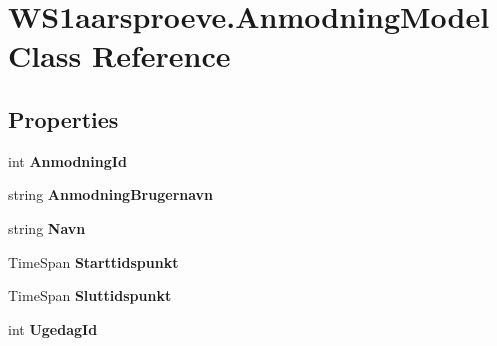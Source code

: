 \hypertarget{class_w_s1aarsproeve_1_1_anmodning_model}{}\section{W\+S1aarsproeve.\+Anmodning\+Model Class Reference}
\label{class_w_s1aarsproeve_1_1_anmodning_model}
\subsection*{Properties}
\begin{DoxyCompactItemize}
\item 
\hypertarget{class_w_s1aarsproeve_1_1_anmodning_model_a888fb493a1f91da3fce495f4191aa8a1}{}int {\bfseries Anmodning\+Id}\label{class_w_s1aarsproeve_1_1_anmodning_model_a888fb493a1f91da3fce495f4191aa8a1}

\item 
\hypertarget{class_w_s1aarsproeve_1_1_anmodning_model_aa9f6adc7f666e3f3eff29c62a34b49e9}{}string {\bfseries Anmodning\+Brugernavn}\label{class_w_s1aarsproeve_1_1_anmodning_model_aa9f6adc7f666e3f3eff29c62a34b49e9}

\item 
\hypertarget{class_w_s1aarsproeve_1_1_anmodning_model_a2193d20eb20b854efda017a500c1c600}{}string {\bfseries Navn}\label{class_w_s1aarsproeve_1_1_anmodning_model_a2193d20eb20b854efda017a500c1c600}

\item 
\hypertarget{class_w_s1aarsproeve_1_1_anmodning_model_a1428099a99c971a65493972cd4142b6f}{}Time\+Span {\bfseries Starttidspunkt}\label{class_w_s1aarsproeve_1_1_anmodning_model_a1428099a99c971a65493972cd4142b6f}

\item 
\hypertarget{class_w_s1aarsproeve_1_1_anmodning_model_a4b9c1312a7626fde76a4b2b6bea6b8bd}{}Time\+Span {\bfseries Sluttidspunkt}\label{class_w_s1aarsproeve_1_1_anmodning_model_a4b9c1312a7626fde76a4b2b6bea6b8bd}

\item 
\hypertarget{class_w_s1aarsproeve_1_1_anmodning_model_a0f7af291718b9b214377949445ac6a3d}{}int {\bfseries Ugedag\+Id}\label{class_w_s1aarsproeve_1_1_anmodning_model_a0f7af291718b9b214377949445ac6a3d}


\end{DoxyCompactItemize}
